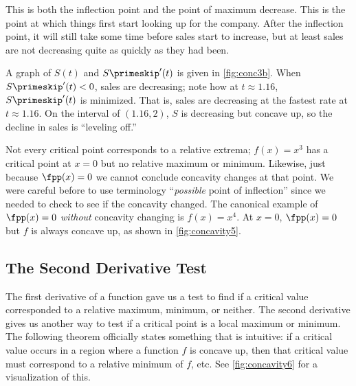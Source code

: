 \begin{example}
This is both the inflection point and the point of maximum decrease.  This is the point at which things first start looking up for the company.  After the inflection point, it will still take some time before sales start to increase, but at least sales are not decreasing quite as quickly as they had been.

A graph of $S(t)$ and $S\primeskip'(t)$ is given in \autoref{fig:conc3b}. When $S\primeskip'(t)<0$, sales are decreasing; note how at $t\approx 1.16$, $S\primeskip'(t)$ is minimized. That is, sales are decreasing at the fastest rate at $t\approx 1.16$.  On the interval of $(1.16,2)$, $S$ is decreasing but concave up, so the decline in sales is ``leveling off.''
\end{example}

Not every critical point corresponds to a relative extrema; $f(x)=x^3$ has a critical point at $x=0$ but no relative maximum or minimum. Likewise, just because $\fpp(x)=0$ we cannot conclude concavity changes at that point. We were careful before to use terminology ``\emph{possible} point of inflection'' since we needed to check to see if the concavity changed. The canonical example of $\fpp(x)=0$ \emph{without} concavity changing is $f(x)=x^4$. At $x=0$, $\fpp(x)=0$ but $f$ is always concave up, as shown in \autoref{fig:concavity5}.



\subsection{The Second Derivative Test}

The first derivative of a function gave us a test to find if a critical value corresponded to a relative maximum, minimum, or neither. The second derivative gives us another way to test if a critical point is a local maximum or minimum. The following theorem officially states something that is intuitive: if a critical value occurs in a region where a function $f$ is concave up, then that critical value must correspond to a relative minimum of $f$, etc. See \autoref{fig:concavity6} for a visualization of this.

